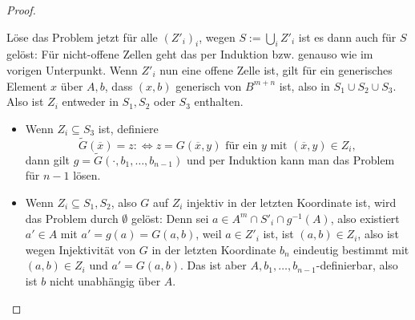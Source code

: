 \begin{proof}
\begin{itemize}
\begin{itemize}
			Löse das Problem jetzt für alle $(Z'_i)_i$, wegen $S:=\bigcup\limits_i Z'_i$ ist es dann auch für $S$ gelöst: Für nicht-offene Zellen geht das per Induktion bzw. genauso wie im vorigen Unterpunkt. Wenn $Z'_i$ nun eine offene Zelle ist, gilt für ein generisches Element $x$ über $A,b$, dass $(x,b)$ generisch von $B^{m+n}$ ist, also in $S_1\cup S_2\cup S_3$. Also ist $Z_i$ entweder in $S_1,S_2$ oder $S_3$ enthalten.
			\begin{itemize}
				\item Wenn $Z_i\subseteq S_3$ ist, definiere $$\tilde{G}(\overline{x})=z:\Leftrightarrow z=G(\overline{x},y)\text{ für ein }y\text{ mit }(\overline{x},y)\in Z_i,$$ dann gilt $g=\tilde{G}(\cdot,b_1,\dots,b_{n-1})$ und per Induktion kann man das Problem für $n-1$ lösen.
				\item Wenn $Z_i\subseteq S_1,S_2$, also $G$ auf $Z_i$ injektiv in der letzten Koordinate ist, wird das Problem durch $\emptyset$ gelöst: Denn sei $a\in A^m\cap S'_i\cap g^{-1}(A)$, also existiert $a'\in A$ mit $a'=g(a)=G(a,b)$, weil $a\in Z'_i$ ist, ist $(a,b)\in Z_i$, also ist wegen Injektivität von $G$ in der letzten Koordinate $b_n$ eindeutig bestimmt mit $(a,b)\in Z_i$ und $a'=G(a,b)$. Das ist aber $A,b_1,\dots,b_{n-1}$-definierbar, also ist $b$ nicht unabhängig über $A$.
			\end{itemize}
		\end{itemize}
	\end{itemize}
\end{proof}